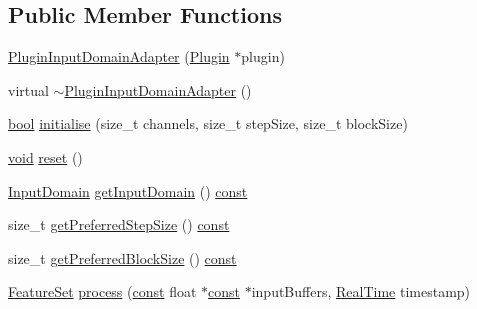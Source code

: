 \subsection*{Public Member Functions}
\begin{DoxyCompactItemize}
\item 
\hyperlink{class_vamp_1_1_host_ext_1_1_plugin_input_domain_adapter_a878e7275acdb77efc7a802944305039d}{Plugin\+Input\+Domain\+Adapter} (\hyperlink{class_vamp_1_1_plugin}{Plugin} $\ast$plugin)
\item 
virtual \hyperlink{class_vamp_1_1_host_ext_1_1_plugin_input_domain_adapter_aec457c952155adf516dd8e3dc7739321}{$\sim$\+Plugin\+Input\+Domain\+Adapter} ()
\item 
\hyperlink{mac_2config_2i386_2lib-src_2libsoxr_2soxr-config_8h_abb452686968e48b67397da5f97445f5b}{bool} \hyperlink{class_vamp_1_1_host_ext_1_1_plugin_input_domain_adapter_a72d201eca10ec73bf16e07984f58f94c}{initialise} (size\+\_\+t channels, size\+\_\+t step\+Size, size\+\_\+t block\+Size)
\item 
\hyperlink{sound_8c_ae35f5844602719cf66324f4de2a658b3}{void} \hyperlink{class_vamp_1_1_host_ext_1_1_plugin_input_domain_adapter_a984a12b5b4cb0be1e2f7a0aa84106c4c}{reset} ()
\item 
\hyperlink{class_vamp_1_1_plugin_a39cb7649d6dcc20e4cb1640cd55907bc}{Input\+Domain} \hyperlink{class_vamp_1_1_host_ext_1_1_plugin_input_domain_adapter_a376fa97a1c721255541fe35d71368976}{get\+Input\+Domain} () \hyperlink{getopt1_8c_a2c212835823e3c54a8ab6d95c652660e}{const} 
\item 
size\+\_\+t \hyperlink{class_vamp_1_1_host_ext_1_1_plugin_input_domain_adapter_ad979af9f1cbf2eeb16f4eaedb4a4f565}{get\+Preferred\+Step\+Size} () \hyperlink{getopt1_8c_a2c212835823e3c54a8ab6d95c652660e}{const} 
\item 
size\+\_\+t \hyperlink{class_vamp_1_1_host_ext_1_1_plugin_input_domain_adapter_a4cf40d09d02022b1962ff17bb0324ea5}{get\+Preferred\+Block\+Size} () \hyperlink{getopt1_8c_a2c212835823e3c54a8ab6d95c652660e}{const} 
\item 
\hyperlink{class_vamp_1_1_plugin_a448fb57dc245d47923ec9eeaf9856c5f}{Feature\+Set} \hyperlink{class_vamp_1_1_host_ext_1_1_plugin_input_domain_adapter_a0867737693c16801d40a6adbde07ec07}{process} (\hyperlink{getopt1_8c_a2c212835823e3c54a8ab6d95c652660e}{const} float $\ast$\hyperlink{getopt1_8c_a2c212835823e3c54a8ab6d95c652660e}{const} $\ast$input\+Buffers, \hyperlink{struct_vamp_1_1_real_time}{Real\+Time} timestamp)
\item 

\end{DoxyCompactItemize}
